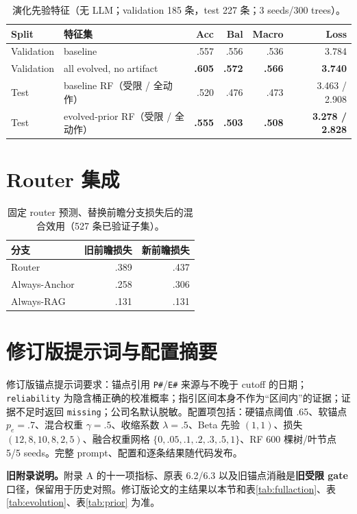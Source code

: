 \begin{table}[H]
\centering
{}
\setlength{\tabcolsep}{3pt}
\caption{演化先验特征（无 LLM；validation 185 条，test 227 条；3 seeds/300 trees）。}
\label{tab:g-prior}
\begin{tabular}{llrrrr}
\toprule
Split & 特征集 & Acc & Bal & Macro & Loss \\
\midrule
Validation & baseline & .557 & .556 & .536 & 3.784 \\
\rowcolor{yellow!18} Validation & all evolved, no artifact & \textbf{.605} & \textbf{.572} & \textbf{.566} & \textbf{3.740} \\
Test & baseline RF（受限 / 全动作） & .520 & .476 & .473 & 3.463 / 2.908 \\
\rowcolor{yellow!18} Test & evolved-prior RF（受限 / 全动作） & \textbf{.555} & \textbf{.503} & \textbf{.508} & \textbf{3.278 / 2.828} \\
\bottomrule
\end{tabular}
\end{table}

\section{Router 集成}

\begin{table}[H]
\centering
{}
\caption{固定 router 预测、替换前瞻分支损失后的混合效用（527 条已验证子集）。}
\label{tab:g-router}
\begin{tabular}{lrr}
\toprule
分支 & 旧前瞻损失 & 新前瞻损失 \\
\midrule
Router & .389 & \cellcolor{yellow!25}.437 \\
Always-Anchor & .258 & \cellcolor{yellow!25}.306 \\
Always-RAG & .131 & .131 \\
\bottomrule
\end{tabular}
\end{table}

\section{修订版提示词与配置摘要}

\begin{revbox}
\noindent 修订版锚点提示词要求：锚点引用 \texttt{P\#}/\texttt{E\#} 来源与不晚于 cutoff 的日期；\texttt{reliability} 为隐含桶正确的校准概率；指引区间本身不作为“区间内”的证据；证据不足时返回 \texttt{missing}；公司名默认脱敏。配置项包括：硬锚点阈值 .65、软锚点 $p_e=.7$、混合权重 $\gamma=.5$、收缩系数 $\lambda=.5$、Beta 先验 $(1,1)$、损失 $(12,8,10,8,2,5)$、融合权重网格 $\{0,.05,.1,.2,.3,.5,1\}$、RF 600 棵树/叶节点 5/5 seeds。完整 prompt、配置和逐条结果随代码发布。
\end{revbox}

\begin{revbox}
\noindent\textbf{旧附录说明。}附录 A 的十一项指标、原表 6.2/6.3 以及旧锚点消融是\textbf{旧受限 gate} 口径，保留用于历史对照。修订版论文的主结果以本节和表\ref{tab:fullaction}、表\ref{tab:evolution}、表\ref{tab:prior} 为准。
\end{revbox}
